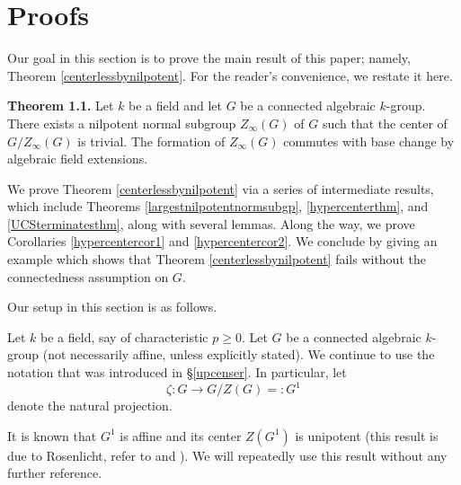 \documentclass[twoside,a4paper,reqno,11pt]{amsart}
\theoremstyle{definition}
\begin{document}




\section{Proofs}\label{proofs}

\noindent Our goal in this section is to prove the main result of this paper; namely, Theorem \ref{centerlessbynilpotent}. For the reader's convenience, we restate it here.

\vspace{2mm}\noindent \textbf{Theorem 1.1.} Let $k$ be a field and let $G$ be a connected algebraic $k$-group. There exists a nilpotent normal subgroup $Z_\infty(G)$ of $G$ such that the center of $G/Z_\infty(G)$ is trivial. The formation of $Z_\infty(G)$ commutes with base change by algebraic field extensions.

\vspace{2mm}\noindent We prove Theorem \ref{centerlessbynilpotent} via a series of intermediate results, which include Theorems \ref{largestnilpotentnormsubgp}, \ref{hypercenterthm}, and \ref{UCSterminatesthm}, along with several lemmas. Along the way, we prove Corollaries \ref{hypercentercor1} and \ref{hypercentercor2}. We conclude by giving an example which shows that Theorem \ref{centerlessbynilpotent} fails without the connectedness assumption on $G$.

\vspace{2mm}\noindent Our setup in this section is as follows.

\vspace{2mm}\noindent Let $k$ be a field, say of characteristic $p\geq 0$. Let $G$ be a connected algebraic $k$-group (not necessarily affine, unless explicitly stated). We continue to use the notation that was introduced in \S \ref{upcenser}. In particular, let \begin{equation}\label{centralquotientmap} \zeta:G\to G/Z(G)=:G^1\end{equation} denote the natural projection.

\vspace{2mm}\noindent It is known that $G^1$ is affine and its center $Z(G^1)$ is unipotent (this result is due to Rosenlicht, refer to \cite[Cor.\ 8.11]{Mi} %
and \cite[XVII, Lem.\ 7.3.2]{SGA3}). %
We will repeatedly use this result without any further reference.
\end{document}
